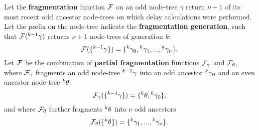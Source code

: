 
\begin{definition}\label{def:fragmentation}
  Let the \textbf{fragmentation} function $\mathcal{F}$ on an odd node-tree $\gamma$ return $\nu + 1$ of its most recent odd ancestor node-trees on which delay calculations were performed. Let the prefix on the node-tree indicate the \textbf{fragmentation generation}, such that $\mathcal{F}({}^{k-1}\gamma)$ returns $\nu + 1$ node-trees of generation $k$:
  \begin{equation}\label{eq:fstep}
    \mathcal{F}(\{{}^{k-1}\gamma\}) = \{{}^{k}\gamma_0,{}^{k}\gamma_1,...,{}^{k}\gamma_{\nu}\}.
  \end{equation}
  Let $\mathcal{F}$ be the combination of \textbf{partial fragmentation} functions $\mathcal{F}_\gamma$ and $\mathcal{F}_\theta$, where $\mathcal{F}_\gamma$ fragments an odd node-tree ${}^{k-1}\gamma$ into an odd ancestor ${}^{k}\gamma_0$ and an even ancestor node-tree ${}^{k}\theta$: 
  \begin{equation}\label{eq:pfo}
    \mathcal{F}_\gamma(\{{}^{k-1}\gamma\}) = \{{}^{k}\theta, {}^{k}\gamma_0 \},
  \end{equation}
  and where $\mathcal{F}_\theta$ further fragments ${}^{k}\theta$ into $\nu$ odd ancestors
  \begin{equation}\label{eq:pfe}
    \mathcal{F}_\theta(\{{}^{k}\theta\}) =\{{}^{k}\gamma_1,...,{}^{k}\gamma_{\nu}\}.
  \end{equation}

\end{definition}

